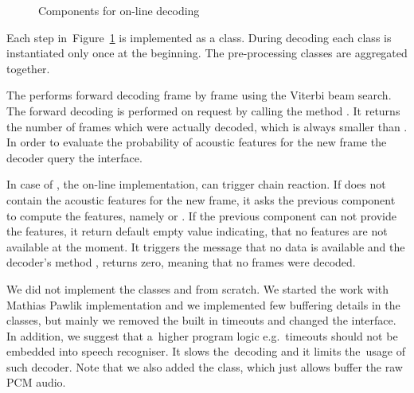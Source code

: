 \begin{figure}[!htp]
    \begin{center}
        
        \caption{Components for on-line decoding}
    \label{fig:online_pipeline} 
    \end{center}
\end{figure}

Each step in~Figure~\ref{fig:online_pipeline} is implemented as a class.
During decoding each class is instantiated only once at the beginning.
The pre-processing classes are aggregated together. 

The  performs forward decoding frame by frame using the Viterbi beam search.
The forward decoding is performed on request by calling the method .
It returns the number of frames which were actually decoded, which is always smaller than .
In order to evaluate the probability of acoustic features for the new frame
the decoder query the  interface.

In case of , the on-line implementation, can trigger chain reaction.
If  does not contain the acoustic features for the new frame, it asks
the previous component to compute the features, namely  or .
If the previous component can not provide the features, it return default empty value indicating,
that no features are not available at the moment. It triggers the message that no data is available
and the decoder's method , returns zero, meaning that no frames were decoded.


We did not implement the classes  and 
from scratch. We started the work with Mathias Pawlik implementation and we implemented few buffering details
in the classes, but mainly we removed the built in timeouts and changed the interface.
In addition, we suggest that a~higher program logic e.g.\ timeouts should not be embedded into speech recogniser.
It slows the~decoding and it limits the~usage of such decoder.
Note that we also added the  class, which just allows buffer the raw \ac{PCM} audio.






